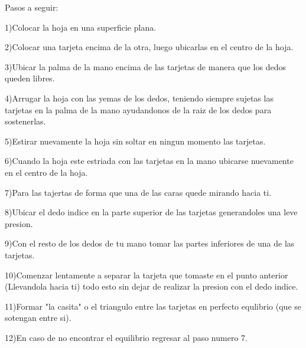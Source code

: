 \documentclass{article}
\begin{document}
\begin{intemize}
 \item Pasos a seguir:
 \item 1)Colocar la hoja en una superficie plana.
 \item 2)Colocar una tarjeta encima de la otra, luego ubicarlas en el centro de la hoja.
 \item 3)Ubicar la palma de la mano encima de las tarjetas de manera que los dedos queden libres.
 \item 4)Arrugar la hoja con las yemas de los dedos, teniendo siempre sujetas las tarjetas en la palma de la mano ayudandonos de la raiz de los dedos para sostenerlas.
 \item 5)Estirar nuevamente la hoja sin soltar en ningun momento las tarjetas.
 \item 6)Cuando la hoja este estriada con las tarjetas en la mano ubicarse nuevamente en el centro de la hoja.
 \item 7)Para las tajertas de forma que una de las caras quede mirando hacia ti.
 \item 8)Ubicar el dedo indice en la parte superior de las tarjetas generandoles una leve presion.
 \item 9)Con el resto de los dedos de tu mano tomar las partes inferiores de una de las tarjetas.
 \item 10)Comenzar lentamente a separar la tarjeta que tomaste en el punto anterior (Llevandola hacia ti) todo esto sin dejar de realizar la presion con el dedo indice.
 \item 11)Formar "la casita" o el triangulo entre las tarjetas en perfecto equlibrio (que se sotengan entre si).
 \item 12)En caso de no encontrar el equilibrio regresar al paso numero 7.
\end{intemize}
\end{document}
